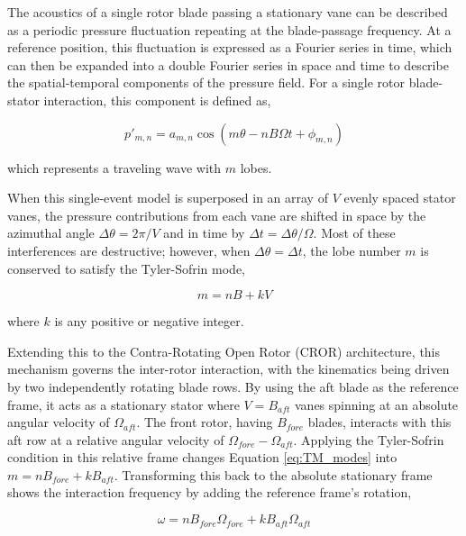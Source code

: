 The acoustics of a single rotor blade passing a stationary vane can be described as a periodic pressure fluctuation repeating at the blade-passage frequency. At a reference position, this fluctuation is expressed as a Fourier series in time, which can then be expanded into a double Fourier series in space and time to describe the spatial-temporal components of the pressure field. For a single rotor blade-stator interaction, this component is defined as,

\begin{equation}
    p'_{m,n}=a_{m,n}\cos(m\theta - nB\Omega t + \phi_{m,n})
    \label{eq:TM_pressure_modes}
\end{equation}

which represents a traveling wave with $m$ lobes. 

When this single-event model is superposed in an array of $V$ evenly spaced stator vanes, the pressure contributions from each vane are shifted in space by the azimuthal angle $\Delta \theta = 2\pi / V$ and in time by $\Delta t = \Delta \theta / \Omega$. Most of these interferences are destructive; however, when $\Delta\theta=\Delta t$, the lobe number $m$ is conserved to satisfy the Tyler-Sofrin mode,

\begin{equation}
    m = nB + kV
    \label{eq:TM_modes}
\end{equation}

where $k$ is any positive or negative integer.

Extending this to the Contra-Rotating Open Rotor (CROR) architecture, this mechanism governs the inter-rotor interaction, with the kinematics being driven by two independently rotating blade rows. By using the aft blade as the reference frame, it acts as a stationary stator where $V=B_{aft}$ vanes spinning at an absolute angular velocity of $\Omega_{aft}$. The front rotor, having $B_{fore}$ blades, interacts with this aft row at a relative angular velocity of $\Omega_{fore} - \Omega_{aft}$. Applying the Tyler-Sofrin condition in this relative frame changes Equation \ref{eq:TM_modes} into $m=nB_{fore}+kB_{aft}$. Transforming this back to the absolute stationary frame shows the interaction frequency by adding the reference frame's rotation,

\begin{equation}
    \omega = nB_{fore}\Omega_{fore} + kB_{aft}\Omega_{aft}
    \label{eq:TM_interaction_freq}
\end{equation}

